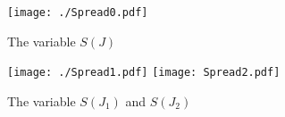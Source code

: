 \begin{figure}[H]
    \begin{center}
        \texttt{[image: ./Spread0.pdf]}
        \caption{ The variable $S\left(J\right)$  }
        \label{fig:Spread0}
    \end{center}
\end{figure}

\begin{figure}[H]
    \begin{center}
        \texttt{[image: ./Spread1.pdf]}
        \texttt{[image: Spread2.pdf]}\\
        \caption{ The variable $S\left(J_1\right)$  and $S\left(J_2\right)$ }
        \label{fig:SpreadX}
    \end{center}
\end{figure}